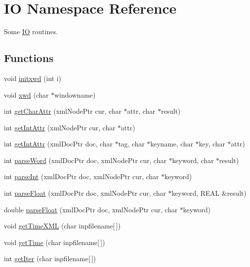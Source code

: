 \hypertarget{namespaceIO}{
\section{IO Namespace Reference}
\label{namespaceIO}
}
Some \hyperlink{namespaceIO}{IO} routines.  


\subsection*{Functions}
\begin{CompactItemize}
\item 
void \hyperlink{namespaceIO_2b0843f1085e5877aa8a10051f3e4f2c}{initxwd} (int i)
\item 
void \hyperlink{namespaceIO_86c41e7ac36635653e7ebf4b72df9801}{xwd} (char $\ast$windowname)
\item 
int \hyperlink{namespaceIO_26ddf14f09f4920f5578ffbf80e37cb5}{getCharAttr} (xmlNodePtr cur, char $\ast$attr, char $\ast$result)
\item 
int \hyperlink{namespaceIO_b5b9ada82ed259c520bb673e1c4258dc}{getIntAttr} (xmlNodePtr cur, char $\ast$attr)
\item 
int \hyperlink{namespaceIO_cede0d1cb29c928037684467fda0b02a}{getIntAttr} (xmlDocPtr doc, char $\ast$tag, char $\ast$keyname, char $\ast$key, char $\ast$attr)
\item 
int \hyperlink{namespaceIO_300fd8cb58ab398ac9ad83ce857b874e}{parseWord} (xmlDocPtr doc, xmlNodePtr cur, char $\ast$keyword, char $\ast$result)
\item 
int \hyperlink{namespaceIO_d0eeab644b5eaf9455f04c84be01af30}{parseInt} (xmlDocPtr doc, xmlNodePtr cur, char $\ast$keyword)
\item 
int \hyperlink{namespaceIO_d779767981775bbcac51a4a6cbd5ce60}{parseFloat} (xmlDocPtr doc, xmlNodePtr cur, char $\ast$keyword, REAL \&result)
\item 
double \hyperlink{namespaceIO_0fce622fef6e4870e9a4ae547a5e759d}{parseFloat} (xmlDocPtr doc, xmlNodePtr cur, char $\ast$keyword)
\item 
void \hyperlink{namespaceIO_d86f2db07db8938db8a574e4e7392cad}{getTimeXML} (char inpfilename\mbox{[}$\,$\mbox{]})
\item 
void \hyperlink{namespaceIO_c2c6e9ae8fe7b5879dcf6383cb132f78}{getTime} (char inpfilename\mbox{[}$\,$\mbox{]})
\item 
int \hyperlink{namespaceIO_515d0f0fecb2223a56797e610ab7fd55}{getIter} (char inpfilename\mbox{[}$\,$\mbox{]})
\end{CompactItemize}

